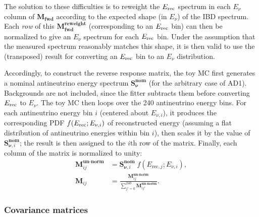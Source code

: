 \documentclass[../thesis.tex]{subfiles}
\begin{document}
The solution to these difficulties is to reweight the $E_\mathrm{rec}$ spectrum in each $E_\nu$ column of $\mathbf{M_{fwd}}$ according to the expected shape (in $E_\nu$) of the IBD spectrum.
Each \emph{row} of this $\mathbf{M_{fwd}^{reweight}}$ (corresponding to an $E_\mathrm{rec}$ bin) can then be normalized to give an $E_\nu$ spectrum for each $E_\mathrm{rec}$ bin. Under the assumption that the measured spectrum reasonably matches this shape, it is then valid to use the (transposed) result for converting an $E_\mathrm{rec}$ bin to an $E_\nu$ distribution.

\begin{comment}
\footnote{Given that the shape is distorted both by oscillations and by differences in the fission fractions, it is important to verify that the analysis is insensitive to such variations in the spectral shape. XXX, was this done?}
\end{comment}

\begin{comment}
  We should fix genEvisToEnuMatrix.C to turn off the theta13 oscillation, and then note below that oscillations are disabled.
\end{comment}

Accordingly, to construct the reverse response matrix, the toy MC first generates a nominal antineutrino energy spectrum $\mathbf{S^{nom}_\nu}$ (for the arbitrary case of AD1). Backgrounds are not included, since the fitter subtracts them before converting $E_\mathrm{rec}$ to $E_\nu$. The toy MC then loops over the 240 antineutrino energy bins. For each antineutrino energy bin $i$ (centered about $E_{\nu,i}$), it produces the corresponding PDF $f(E_\mathrm{rec}; E_{\nu,i})$ of reconstructed energy (assuming a flat distribution of antineutrino energies within bin $i$), then scales it by the value of $\mathbf{S}^{\mathbf{nom}}_{\mathbf{\nu},i}$; the result is then assigned to the $i$th row of the matrix. Finally, each column of the matrix is normalized to unity:
\begin{align}
  \label{eq:revRespMtxUnNorm}
  \mathbf{M}^{\textbf{un-norm}}_{ij} &= \mathbf{S}^{\mathbf{nom}}_{\mathbf{\nu},i} \; f(E_{\mathrm{rec},j}; E_{\nu,i}), \\
  \label{eq:revRespMtx}
  \mathbf{M}_{ij} &= \frac{\mathbf{M}^{\textbf{un-norm}}_{ij}}{\sum_{j'=0}^{240} \mathbf{M}^{\textbf{un-norm}}_{ij'}}.
\end{align}

\subsubsection{Covariance matrices}
\end{document}

